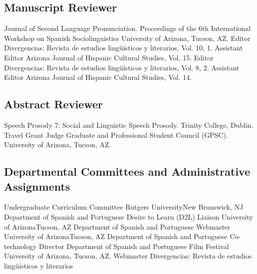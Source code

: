 \documentclass[11pt,letterpaper]{moderncv}
\begin{document}
\subsection{Manuscript Reviewer}
        {Journal of Second Language Pronunciation.}
        {}
        {}
        {}
        {}
        {Proceedings of the 6th International Workshop on Spanish Sociolinguistics}
        {}
        {}
        {}
        {University of Arizona, Tucson, AZ.}
        {Editor}
        {Divergencias: Revista de estudios ling\"u\'isticos y literarios, Vol. 10, 1.}
        {}
        {}
        {}
        {Assistant Editor}
        {Arizona Journal of Hispanic Cultural Studies, Vol. 15.}
        {}
        {}
        {}
        {Editor}
        {Divergencias: Revista de estudios ling\"u\'isticos y literarios, Vol. 8, 2.}
        {}
        {}
        {}
        {Assistant Editor}
        {Arizona Journal of Hispanic Cultural Studies, Vol. 14.}
        {}
        {}
        {}

\subsection{Abstract Reviewer}
        {Speech Prosody 7: Social and Linguistic Speech Prosody.}
        {}
        {}
        {}
        {Trinity College, Dublin.}
        {Travel Grant Judge}
        {Graduate and Professional Student Council (GPSC).}
        {}
        {}
        {University of Arizona, Tucson, AZ.}

\subsection{Departmental Committees and Administrative Assignments}
        {Undergraduate Curriculum Committee}
        {Rutgers University}{New Brunswick, NJ}
        {}
        {Department of Spanish and Portuguese}
        {}
        {Desire to Learn (D2L) Liaison}
        {University of Arizona}{Tucson, AZ}
        {}
        {Department of Spanish and Portuguese}
        {}
        {}
        {Webmaster}
        {University of Arizona}{Tucson, AZ}
        {}
        {Department of Spanish and Portuguese}
        {}
        {}
        {Co-technology Director}
        {Department of Spanish and Portuguese Film Festival}
        {}
        {}
        {University of Arizona, Tucson, AZ.}
        {Webmaster}
        {Divergencias: Revista de estudios ling\"u\'isticos y literarios}
        {}
        {}
        {}
\end{document}
